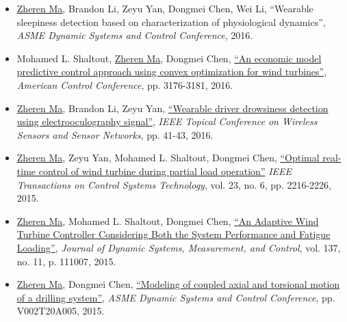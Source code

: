 \documentclass[margin, 9pt]{res}
\begin{document}
\begin{resume}
\begin{itemize}[leftmargin=*]
    \item \underline{Zheren Ma}, Brandon Li, Zeyu Yan, Dongmei Chen, Wei Li,
        {``Wearable sleepiness detection based on characterization of physiological dynamics''},
       \textit{ASME Dynamic Systems and Control Conference}, 2016.

        \item Mohamed L. Shaltout, \underline{Zheren Ma}, Dongmei Chen,
         \href{http://ieeexplore.ieee.org/xpl/login.jsp?tp=&arnumber=7525406&url=http\%3A\%2F\%2Fieeexplore.ieee.org\%2Fxpls\%2Fabs_all.jsp\%3Farnumber\%3D7525406}
          {``An economic model predictive control approach using convex optimization for wind turbines''},
          \textit{American Control Conference}, pp. 3176-3181, 2016.

    \item \underline{Zheren Ma}, Brandon Li, Zeyu Yan,
         \href{http://ieeexplore.ieee.org/xpl/login.jsp?tp=&arnumber=7444317&url=http\%3A\%2F\%2Fieeexplore.ieee.org\%2Fxpls\%2Fabs_all.jsp\%3Farnumber\%3D7444317}
          {``Wearable driver drowsiness detection using electrooculography signal''},
          \textit{IEEE Topical Conference on Wireless Sensors and Sensor Networks}, pp. 41-43, 2016.

	\item \underline{Zheren Ma}, Zeyu Yan, Mohamed L. Shaltout, Dongmei Chen,
          \href{http://ieeexplore.ieee.org/xpl/login.jsp?tp=&arnumber=7065260&url=http\%3A\%2F\%2Fieeexplore.ieee.org\%2Fxpls\%2Fabs_all.jsp\%3Farnumber\%3D7065260}
          {``Optimal real-time control of wind turbine during partial load operation''}
          \textit{IEEE Transactions on Control Systems Technology}, vol. 23, no. 6, pp. 2216-2226, 2015.

   \item \underline{Zheren Ma}, Mohamed L. Shaltout, Dongmei Chen,
          \href{http://dynamicsystems.asmedigitalcollection.asme.org/article.aspx?articleid=2468735}
          {``An Adaptive Wind Turbine Controller Considering Both the System Performance and Fatigue Loading''},
          \textit{Journal of Dynamic Systems, Measurement, and Control}, vol. 137, no. 11, p. 111007, 2015.

	\item \underline{Zheren Ma}, Dongmei Chen,
          \href{http://proceedings.asmedigitalcollection.asme.org/proceeding.aspx?articleid=2481922}{``Modeling of coupled axial and torsional motion of a drilling system''},
          \textit{ASME Dynamic Systems and Control Conference}, pp. V002T20A005, 2015.


\end{itemize}
\end{resume}
\end{document}
